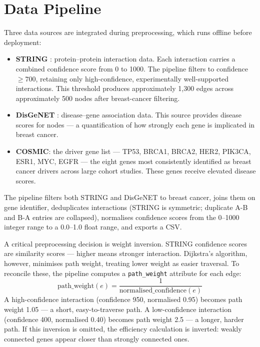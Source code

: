 \documentclass[12pt,a4paper]{report}
\begin{document}
\section{Data Pipeline}

Three data sources are integrated during preprocessing, which runs offline before deployment:

\begin{itemize}
  \item \textbf{STRING} \citep{szklarczyk2023string}: protein–protein interaction data. Each interaction carries a combined confidence score from 0 to 1000. The pipeline filters to confidence $\geq 700$, retaining only high-confidence, experimentally well-supported interactions. This threshold produces approximately 1{,}300 edges across approximately 500 nodes after breast-cancer filtering.
  \item \textbf{DisGeNET} \citep{pinero2020disgenet}: disease–gene association data. This source provides disease scores for nodes — a quantification of how strongly each gene is implicated in breast cancer.
  \item \textbf{COSMIC}: the driver gene list — TP53, BRCA1, BRCA2, HER2, PIK3CA, ESR1, MYC, EGFR — the eight genes most consistently identified as breast cancer drivers across large cohort studies. These genes receive elevated disease scores.
\end{itemize}

The pipeline filters both STRING and DisGeNET to breast cancer, joins them on gene identifier, deduplicates interactions (STRING is symmetric; duplicate A-B and B-A entries are collapsed), normalises confidence scores from the 0--1000 integer range to a 0.0--1.0 float range, and exports a CSV.

A critical preprocessing decision is weight inversion. STRING confidence scores are similarity scores — higher means stronger interaction. Dijkstra's algorithm, however, minimises path weight, treating lower weight as easier traversal. To reconcile these, the pipeline computes a \texttt{path\_weight} attribute for each edge:
\begin{equation}
  \text{path\_weight}(e) = \frac{1}{\text{normalised\_confidence}(e)}
\end{equation}
A high-confidence interaction (confidence 950, normalised 0.95) becomes path weight 1.05 — a short, easy-to-traverse path. A low-confidence interaction (confidence 400, normalised 0.40) becomes path weight 2.5 — a longer, harder path. If this inversion is omitted, the efficiency calculation is inverted: weakly connected genes appear closer than strongly connected ones.
\end{document}
